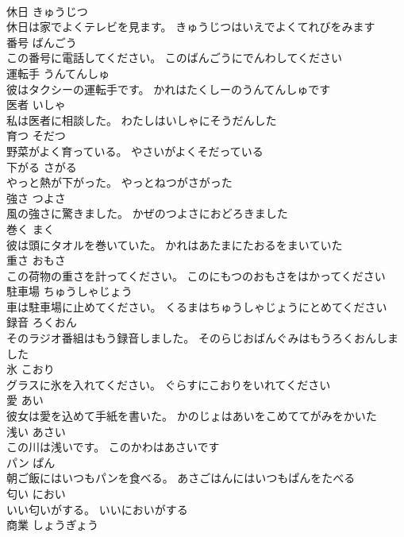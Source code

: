 \documentclass[8pt]{extreport}
\begin{document}
\begin{CJK}{UTF8}{min}
\\	休日	きゅうじつ	
\\	休日は家でよくテレビを見ます。	きゅうじつはいえでよくてれびをみます	
\\	番号	ばんごう	
\\	この番号に電話してください。	このばんごうにでんわしてください	
\\	運転手	うんてんしゅ	
\\	彼はタクシーの運転手です。	かれはたくしーのうんてんしゅです	
\\	医者	いしゃ	
\\	私は医者に相談した。	わたしはいしゃにそうだんした	
\\	育つ	そだつ	
\\	野菜がよく育っている。	やさいがよくそだっている	
\\	下がる	さがる	
\\	やっと熱が下がった。	やっとねつがさがった	
\\	強さ	つよさ	
\\	風の強さに驚きました。	かぜのつよさにおどろきました	
\\	巻く	まく	
\\	彼は頭にタオルを巻いていた。	かれはあたまにたおるをまいていた	
\\	重さ	おもさ	
\\	この荷物の重さを計ってください。	このにもつのおもさをはかってください	
\\	駐車場	ちゅうしゃじょう	
\\	車は駐車場に止めてください。	くるまはちゅうしゃじょうにとめてください	
\\	録音	ろくおん	
\\	そのラジオ番組はもう録音しました。	そのらじおばんぐみはもうろくおんしました	
\\	氷	こおり	
\\	グラスに氷を入れてください。	ぐらすにこおりをいれてください	
\\	愛	あい	
\\	彼女は愛を込めて手紙を書いた。	かのじょはあいをこめててがみをかいた	
\\	浅い	あさい	
\\	この川は浅いです。	このかわはあさいです	
\\	パン	ぱん	
\\	朝ご飯にはいつもパンを食べる。	あさごはんにはいつもぱんをたべる	
\\	匂い	におい	
\\	いい匂いがする。	いいにおいがする	
\\	商業	しょうぎょう	

\end{CJK}
\end{document}
